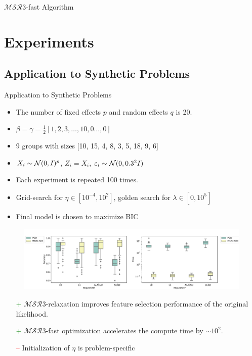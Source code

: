\documentclass[8pt]{beamer}
\newcommand{\ouralgo}{\ensuremath{\mathcal{MSR}3}}
\begin{document}
\begin{frame}{$\ouralgo$-fast Algorithm}

\end{frame}

\section{Experiments}
\subsection{Application to Synthetic Problems}

\begin{frame}{Application to Synthetic Problems}
\begin{itemize}
	\item The number of fixed effects $p$ and random effects $q$ is 20.
	\item $\beta = \gamma = \frac{1}{2}[1,2,3,\dots,10, 0\dots,0]$
	\item 9 groups with sizes [10, 15, 4, 8, 3, 5, 18, 9, 6]
	\item $X_i \sim \operatorname{\mathcal{N}}(0, I)^p$, $Z_i = X_i$, $\varepsilon_i \sim \operatorname{\mathcal{N}}(0, 0.3^2I)$
	\item Each experiment is repeated 100 times.
	\item Grid-search for $\eta \in [10^{-4}, 10^{2}]$, golden search for $\lambda \in [0, 10^5]$
	\item Final model is chosen to maximize BIC
\end{itemize}
\begin{figure}
	\includegraphics[width=\textwidth]{Figures/performance_without_msr3.pdf}
\end{figure}
\begin{itemize}
	\item[\textcolor{green}{+}] $\ouralgo$-relaxation improves feature selection performance of the original likelihood.
	\item[\textcolor{green}{+}] $\ouralgo$-fast optimization accelerates the compute time by $\sim 10^2$.
   	\item[\textcolor{red}{--}] Initialization of $\eta$ is problem-specific
\end{itemize}
\end{frame}
\end{document}
